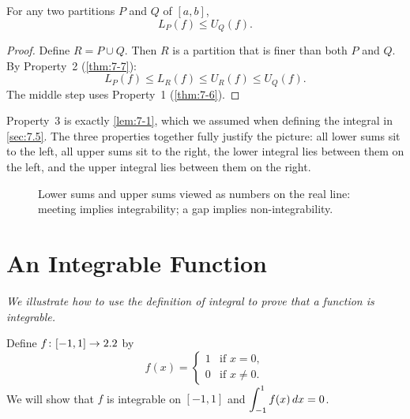 \begin{proposition}
\label{thm:7-8}
For any two partitions $P$ and $Q$ of $[a,b]$,
\[
  L_P(f) \le U_Q(f).
\]
\end{proposition}

\begin{proof}
Define $R = P \cup Q$.  Then $R$ is a partition that is finer than both $P$ and $Q$.  By Property~2 (\cref{thm:7-7}):
\[
  L_P(f) \le L_R(f) \le U_R(f) \le U_Q(f).
\]
The middle step uses Property~1 (\cref{thm:7-6}).
\end{proof}

\begin{remark}
Property~3 is exactly \cref{lem:7-1}, which we assumed when defining the integral in \cref{sec:7.5}.  The three properties together fully justify the picture: all lower sums sit to the left, all upper sums sit to the right, the lower integral lies between them on the left, and the upper integral lies between them on the right.
\end{remark}

\begin{figure}[ht]
  \centering
  \resizebox{\textwidth}{!}{}
  \caption{Lower sums and upper sums viewed as numbers on the real line: meeting implies integrability; a gap implies non-integrability.}
  \label{fig:lower-upper-sums-numberline}
\end{figure}

\section{An Integrable Function}
\label{sec:7.7}

\textit{We illustrate how to use the definition of integral to prove that a function is integrable.}

\begin{example}
\label{ex:7-9}
Define $f \colon [-1,1] \to 2.2$ by
\[
  f(x) = \begin{cases} 1 & \text{if } x = 0, \\ 0 & \text{if } x \ne 0. \end{cases}
\]
We will show that $f$ is integrable on $[-1,1]$ and $\displaystyle\int_{-1}^{1} f(x)\,dx = 0$.
\end{example}

